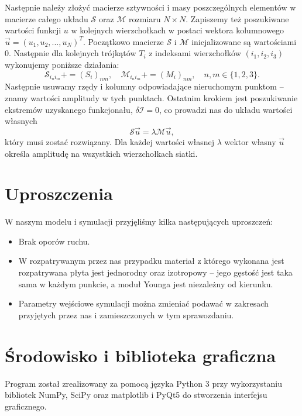 \documentclass{classrep}
\begin{document}
Następnie należy złożyć macierze sztywności i masy poszczególnych elementów w macierze całego układu $\mathcal{S}$ oraz $\mathcal{M}$ rozmiaru $N \times N$. Zapiszemy też poszukiwane wartości funkcji $u$ w kolejnych wierzchołkach w postaci wektora kolumnowego $\Vec{u} = (u_1, u_2, ..., u_N)^T$. Początkowo macierze $\mathcal{S}$ i $\mathcal{M}$ inicjalizowane są wartościami $0$. Następnie dla kolejnych trójkątów $T_i$ z indeksami wierzchołków $(i_1, i_2, i_3)$ wykonujemy poniższe działania:
\begin{equation}
\mathcal{S}_{i_n i_m} += (S_i)_{nm}, \quad \mathcal{M}_{i_n i_m} += (M_i)_{nm}, \quad n, m \in \{1, 2, 3\}.
\end{equation}
Następnie usuwamy rzędy i kolumny odpowiadające nieruchomym punktom -- znamy wartości amplitudy w tych punktach. Ostatnim krokiem jest poszukiwanie ekstremów uzyskanego funkcjonału, $\delta \mathcal{I} = 0$, co prowadzi nas do układu wartości własnych
\begin{equation}
\mathcal{S}\Vec{u} = \lambda \mathcal{M}\Vec{u},
\end{equation}
który musi zostać rozwiązany. Dla każdej wartości własnej $\lambda$ wektor własny $\Vec{u}$ określa amplitudę na wszystkich wierzchołkach siatki.

\section{Uproszczenia}
W naszym modelu i symulacji przyjęliśmy kilka następujących uproszczeń:
\begin{itemize}
	\item Brak oporów ruchu.
	\item W rozpatrywanym przez nas przypadku materiał z którego wykonana jest rozpatrywana płyta jest jednorodny oraz izotropowy -- jego gęstość jest taka sama w każdym punkcie, a moduł Younga jest niezależny od kierunku.
	\item Parametry wejściowe symulacji można zmieniać podawać w zakresach przyjętych przez nas i zamieszczonych w tym sprawozdaniu.
\end{itemize}

\section{Środowisko i biblioteka graficzna}
Program został zrealizowany za pomocą języka Python 3 przy wykorzystaniu bibliotek NumPy, SciPy oraz matplotlib i PyQt5 do stworzenia interfejsu graficznego.
\end{document}
